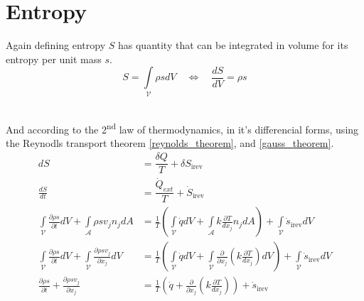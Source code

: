\section{Entropy}
Again defining entropy $S$ has quantity that can be integrated in volume for its entropy per unit mass $s$.
\begin{equation}
    S=\int\limits_{\mathcal{V}}\rho s dV \quad  \Leftrightarrow \quad  \frac{dS}{dV}= \rho s
\end{equation}\

And according to the 2\textsuperscript{nd} law of thermodynamics, in it's differencial forms, using the Reynodls transport theorem \eqref{reynolds_theorem}, and \eqref{gauss_theorem}.
\begin{align}
    \label{differential_entropy}
    dS &= \dfrac{\delta Q}{T} + \delta S_{\text{irev}}\\
    \frac{dS}{dt} &= \dfrac{\dot{Q}_{ext}}{T} + \dot{S}_{\text{irev}}\\
    \int\limits_{\mathcal{V}} \frac{\partial \rho s}{\partial t} dV +
    \int\limits_{\mathcal{A}} \rho s v_j n_j dA &=
    \frac{1}{T}\left(\int\limits_{\mathcal{V}} \dot{q} dV + \int\limits_{\mathcal{A}} k\frac{\partial T}{d x_j} n_j dA \right) + \int\limits_{\mathcal{V}} \dot{s}_{\text{irev}} dV\\
    \int\limits_{\mathcal{V}} \frac{\partial \rho s}{\partial t} dV +
    \int\limits_{\mathcal{V}} \frac{\partial \rho s v_j}{\partial x_j} dV &= \frac{1}{T}\left(\int\limits_{\mathcal{V}} \dot{q} dV + \int\limits_{\mathcal{V}} \frac{\partial} {\partial x_j} \left( k\frac{\partial T}{d x_j} \right) dV \right) + \int\limits_{\mathcal{V}} \dot{s}_{\text{irev}} dV \\
    \frac{\partial \rho s}{\partial t} +  \frac{\partial \rho s v_j}{\partial x_j} &= \frac{1}{T}\left(\dot{q} + \frac{\partial} {\partial x_j} \left( k\frac{\partial T}{d x_j} \right) \right) + \dot{s}_{\text{irev}}
\end{align}







